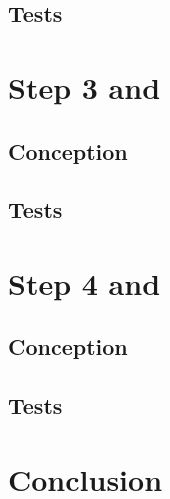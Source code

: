 \documentclass{article}
\begin{document}
    \subsection{Tests}


    \section{Step 3  and }
    \subsection{Conception}
    \subsection{Tests}


    \section{Step 4  and }
    \subsection{Conception}
    \subsection{Tests}

    \section{Conclusion}
\end{document}

